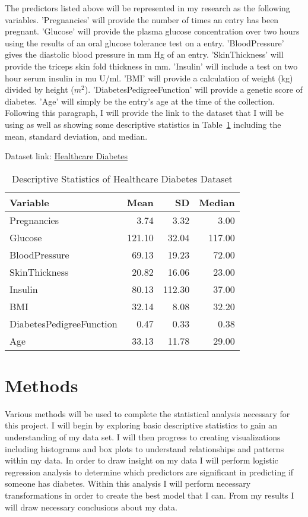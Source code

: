 \documentclass[12pt]{article}
\begin{document}
    The predictors listed above will be represented in my research as the following variables. 'Pregnancies' will provide the number of times an entry has been pregnant. 'Glucose' will provide the plasma glucose concentration over two hours using the results of an oral glucose tolerance test on a entry. 'BloodPressure' gives the diastolic blood pressure in mm Hg of an entry. 'SkinThickness' will provide the triceps skin fold thickness in mm. 'Insulin' will include a test on two hour serum insulin in mu U/ml. 'BMI' will provide a calculation of weight (kg) divided by height ($m^2$). 'DiabetesPedigreeFunction' will provide a genetic score of diabetes. 'Age' will simply be the entry's age at the time of the collection. Following this paragraph, I will provide the link to the dataset that I will be using as well as showing some descriptive statistics in Table~\ref{tab:ds} including the mean, standard deviation, and median.  

Dataset link: \href{https://www.kaggle.com/datasets/nanditapore/healthcare-diabetes}{Healthcare Diabetes}

\begin{table}[ht]
    \caption{Descriptive Statistics of Healthcare Diabetes Dataset}
  \label{tab:ds}
\centering
\begin{tabular}{lrrr}
      \hline
    Variable & Mean & SD & Median \\ 
      \hline
      Pregnancies & 3.74 & 3.32 & 3.00 \\ 
      Glucose & 121.10 & 32.04 & 117.00 \\ 
      BloodPressure & 69.13 & 19.23 & 72.00 \\ 
      SkinThickness & 20.82 & 16.06 & 23.00 \\ 
      Insulin & 80.13 & 112.30 & 37.00 \\ 
      BMI & 32.14 & 8.08 & 32.20 \\ 
      DiabetesPedigreeFunction & 0.47 & 0.33 & 0.38 \\ 
      Age & 33.13 & 11.78 & 29.00 \\ 
       \hline
    \end{tabular}
    \end{table}

\section{Methods}
\label{sec:meth}
    Various methods will be used to complete the statistical analysis necessary for this project. I will begin by exploring basic descriptive statistics to gain an understanding of my data set. I will then progress to creating visualizations including histograms and box plots to understand relationships and patterns within my data. In order to draw insight on my data I will perform logistic regression analysis to determine which predictors are significant in predicting if someone has diabetes. Within this analysis I will perform necessary transformations in order to create the best model that I can. From my results I will draw necessary conclusions about my data.
\end{document}
